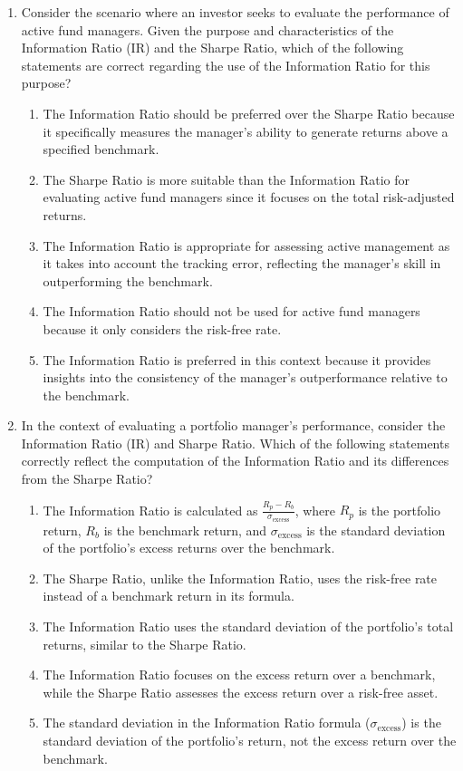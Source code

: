 \documentclass{article}
\begin{document}
\begin{enumerate}
    \item Consider the scenario where an investor seeks to evaluate the performance of active fund managers. Given the purpose and characteristics of the Information Ratio (IR) and the Sharpe Ratio, which of the following statements are correct regarding the use of the Information Ratio for this purpose?
    \begin{enumerate}
        \item The Information Ratio should be preferred over the Sharpe Ratio because it specifically measures the manager's ability to generate returns above a specified benchmark.
        \item The Sharpe Ratio is more suitable than the Information Ratio for evaluating active fund managers since it focuses on the total risk-adjusted returns.
        \item The Information Ratio is appropriate for assessing active management as it takes into account the tracking error, reflecting the manager’s skill in outperforming the benchmark.
        \item The Information Ratio should not be used for active fund managers because it only considers the risk-free rate.
        \item The Information Ratio is preferred in this context because it provides insights into the consistency of the manager's outperformance relative to the benchmark.
    \end{enumerate}
    
    \item In the context of evaluating a portfolio manager's performance, consider the Information Ratio (IR) and Sharpe Ratio. Which of the following statements correctly reflect the computation of the Information Ratio and its differences from the Sharpe Ratio?
    \begin{enumerate}
        \item The Information Ratio is calculated as \(\frac{R_p - R_b}{\sigma_{\text{excess}}}\), where \(R_p\) is the portfolio return, \(R_b\) is the benchmark return, and \(\sigma_{\text{excess}}\) is the standard deviation of the portfolio's excess returns over the benchmark.
        \item The Sharpe Ratio, unlike the Information Ratio, uses the risk-free rate instead of a benchmark return in its formula.
        \item The Information Ratio uses the standard deviation of the portfolio's total returns, similar to the Sharpe Ratio.
        \item The Information Ratio focuses on the excess return over a benchmark, while the Sharpe Ratio assesses the excess return over a risk-free asset.
        \item The standard deviation in the Information Ratio formula (\(\sigma_{\text{excess}}\)) is the standard deviation of the portfolio's return, not the excess return over the benchmark.
    \end{enumerate}


\end{enumerate}
\end{document}
